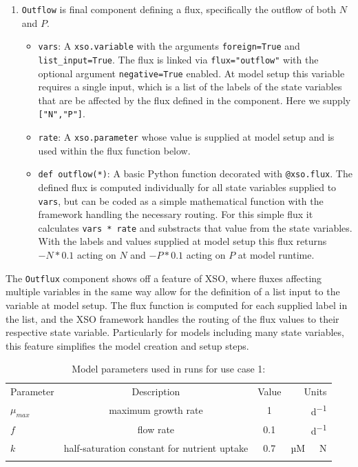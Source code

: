 \documentclass[journal abbreviation, manuscript]{copernicus}
\begin{document}
\begin{enumerate}
    \item \texttt{Outflow} is final component defining a flux, specifically the outflow of both $N$ and $P$.
        \begin{itemize}
        \item \texttt{vars}: A \texttt{xso.variable} with the arguments \texttt{foreign=True} and \texttt{list\_input=True}. The flux is linked via \texttt{flux="outflow"} with the optional argument \texttt{negative=True} enabled. At model setup this variable requires a single input, which is a list of the labels of the state variables that are be affected by the flux defined in the component. Here we supply \texttt{["N","P"]}.
        \item \texttt{rate}: A \texttt{xso.parameter} whose value is supplied at model setup and is used within the flux function below.
        \item \texttt{def outflow(*)}: A basic Python function decorated with \texttt{@xso.flux}. The defined flux is computed individually for all state variables supplied to \texttt{vars}, but can be coded as a simple mathematical function with the framework handling the necessary routing. For this simple flux it calculates \texttt{vars * rate} and substracts that value from the state variables. With the labels and values supplied at model setup this flux returns $- N * 0.1$ acting on $N$ and $-P * 0.1$ acting on $P$ at model runtime.
    \end{itemize}
\end{enumerate}

The \texttt{Outflux} component shows off a feature of XSO, where fluxes affecting multiple variables in the same way allow for the definition of a list input to the variable at model setup. The flux function is computed for each supplied label in the list, and the XSO framework handles the routing of the flux values to their respective state variable. Particularly for models including many state variables, this feature simplifies the model creation and setup steps.

%
\begin{table}[t]
\caption{Model parameters used in runs for use case 1:}
\begin{tabular}{l c c r}
\tophline
Parameter & Description & Value & Units \\
\middlehline

$\mu_{max}$ & maximum growth rate & 1 & \unit{d^{-1}} \\
$f$ & flow rate & 0.1 & \unit{d^{-1}}\\
$k$ & half-saturation constant for nutrient uptake & 0.7 & \unit{µM \ N}\\

\bottomhline
\end{tabular}
\label{Table:UseCase1Parameters}
\end{table}
%
\end{document}
